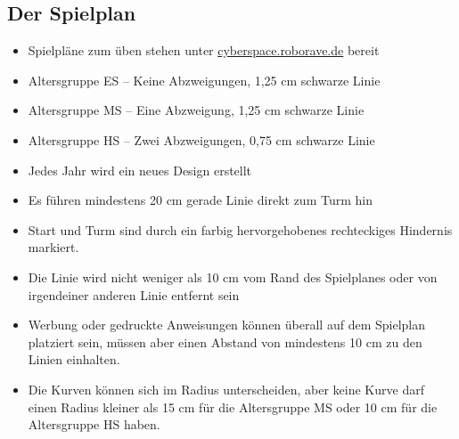 \documentclass[a4paper,12pt]{article}
\begin{document}
\subsection{Der Spielplan}

\begin{itemize}
	\item Spielpläne zum üben stehen unter
\href{https://cyberspace.roborave.de}{cyberspace.roborave.de} bereit
	\item Altersgruppe ES – Keine Abzweigungen, 1,25 cm schwarze Linie
	\item Altersgruppe MS – Eine Abzweigung, 1,25 cm schwarze Linie
	\item Altersgruppe HS – Zwei Abzweigungen, 0,75 cm schwarze Linie
	\item Jedes Jahr wird ein neues Design erstellt
	\item Es führen mindestens 20 cm gerade Linie direkt zum Turm hin
	\item Start und Turm sind durch ein farbig hervorgehobenes rechteckiges
		 Hindernis markiert.
	\item Die Linie wird nicht weniger als 10 cm vom Rand des Spielplanes
		oder von irgendeiner anderen Linie entfernt sein
	\item Werbung oder gedruckte Anweisungen können überall auf dem
		Spielplan platziert sein, müssen aber einen Abstand von
		mindestens 10 cm zu den Linien einhalten.
	\item Die Kurven können sich im Radius unterscheiden, aber keine Kurve
darf einen Radius kleiner als 15 cm für die Altersgruppe MS oder 10 cm für die
Altersgruppe HS haben.
\end{itemize}
\end{document}

